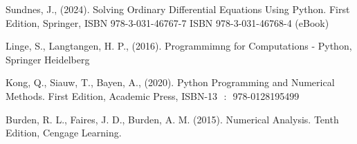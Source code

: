 %
%
%
\begin{refenumerate}
\item Sundnes, J., (2024). Solving Ordinary Differential Equations Using Python. First Edition, Springer,  ISBN 978-3-031-46767-7    ISBN 978-3-031-46768-4 (eBook)\\
\item Linge, S., Langtangen, H. P., (2016). Programmimng for Computations - Python, Springer Heidelberg\\
\item Kong, Q., Siauw, T., Bayen, A., (2020). Python Programming and Numerical Methods. First Edition, Academic Press,  ISBN-13 ‏ : ‎ 978-0128195499 \\
\item Burden, R. L., Faires, J. D., Burden, A. M. (2015). Numerical Analysis. Tenth Edition, Cengage Learning.\\
\end{refenumerate}